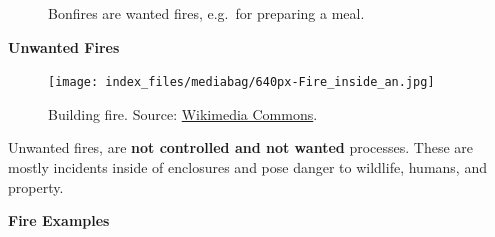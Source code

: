 \documentclass[
  letterpaper,
  DIV=11,
  numbers=noendperiod]{scrreprt}
\begin{document}
\begin{figure}


\caption{\label{fig-bonfire}Bonfires are wanted fires, e.g.~for
preparing a meal.}

\end{figure}%

\textbf{Unwanted Fires}

\begin{figure}

{\centering \texttt{[image: index\_files/mediabag/640px-Fire\_inside\_an.jpg]}

}

\caption{Building fire. Source:
\href{https://commons.wikimedia.org/wiki/File:Fire_inside_an_abandoned_convent_in_Massueville,_Quebec,_Canada.jpg}{Wikimedia
Commons}.}

\end{figure}%

Unwanted fires, are \textbf{not controlled and not wanted} processes.
These are mostly incidents inside of enclosures and pose danger to
wildlife, humans, and property.

\textbf{Fire Examples}
\end{document}
